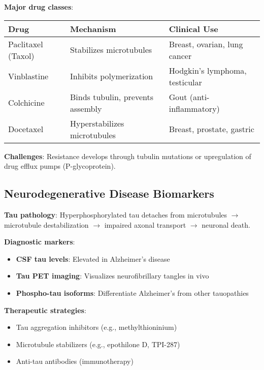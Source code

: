 \textbf{Major drug classes}:

\begin{center}
\begin{tabular}{@{}lll@{}}
\toprule
\textbf{Drug} & \textbf{Mechanism} & \textbf{Clinical Use} \\
\midrule
Paclitaxel (Taxol) & Stabilizes microtubules & Breast, ovarian, lung cancer \\
Vinblastine & Inhibits polymerization & Hodgkin's lymphoma, testicular \\
Colchicine & Binds tubulin, prevents assembly & Gout (anti-inflammatory) \\
Docetaxel & Hyperstabilizes microtubules & Breast, prostate, gastric \\
\bottomrule
\end{tabular}
\end{center}

\textbf{Challenges}: Resistance develops through tubulin mutations or upregulation of drug efflux pumps (P-glycoprotein).

\subsection{Neurodegenerative Disease Biomarkers}
\label{subsec:neurodegen-biomarkers}

\textbf{Tau pathology}: Hyperphosphorylated tau detaches from microtubules $\rightarrow$ microtubule destabilization $\rightarrow$ impaired axonal transport $\rightarrow$ neuronal death.

\textbf{Diagnostic markers}:
\begin{itemize}
\item \textbf{CSF tau levels}: Elevated in Alzheimer's disease
\item \textbf{Tau PET imaging}: Visualizes neurofibrillary tangles in vivo
\item \textbf{Phospho-tau isoforms}: Differentiate Alzheimer's from other tauopathies
\end{itemize}

\textbf{Therapeutic strategies}:
\begin{itemize}
\item Tau aggregation inhibitors (e.g., methylthioninium)
\item Microtubule stabilizers (e.g., epothilone D, TPI-287)
\item Anti-tau antibodies (immunotherapy)
\end{itemize}

